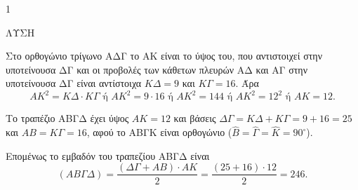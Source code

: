 \begin{ylh}{1}
    \item [Ύλη από εικόνα]
\end{ylh}

ΛΥΣΗ
\begin{alist}
    \item Στο ορθογώνιο τρίγωνο ΑΔΓ το ΑΚ είναι το ύψος του, που αντιστοιχεί στην υποτείνουσα ΔΓ και οι προβολές των κάθετων πλευρών ΑΔ και ΑΓ στην υποτείνουσα ΔΓ είναι αντίστοιχα $ΚΔ = 9$ και $ΚΓ = 16$. Άρα
    \[ ΑΚ^2 = ΚΔ \cdot ΚΓ \text{ ή } ΑΚ^2 = 9 \cdot 16 \text{ ή } ΑΚ^2 = 144 \text{ ή } ΑΚ^2 = 12^2 \text{ ή } ΑΚ = 12. \]
    
    \item Το τραπέζιο ΑΒΓΔ έχει ύψος $ΑΚ = 12$ και βάσεις
    $ΔΓ = ΚΔ + ΚΓ = 9 + 16 = 25$ και
    $ΑΒ = ΚΓ = 16$, αφού το ΑΒΓΚ είναι ορθογώνιο ($\hat{Β} = \hat{Γ} = \hat{Κ} = 90^\circ$).
    
    Επομένως το εμβαδόν του τραπεζίου ΑΒΓΔ είναι
    \[ (ΑΒΓΔ) = \frac{(ΔΓ+ΑΒ) \cdot ΑΚ}{2} = \frac{(25+16) \cdot 12}{2} = 246. \]
\end{alist}